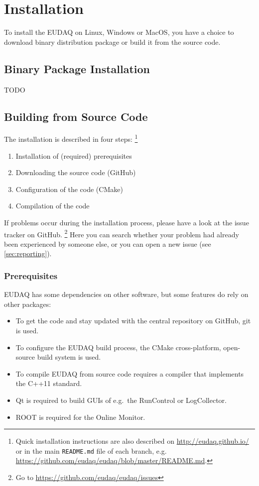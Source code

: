 \section{Installation}
To install the EUDAQ on Linux, Windows or MacOS, you have a choice to download binary distribution package or build it from the source code.

\subsection{Binary Package Installation}
TODO


\subsection{Building from Source Code}

The installation is described in four steps:%
\footnote{Quick installation instructions are also described on \url{http://eudaq.github.io/} or in the main \texttt{README.md} file of each branch, e.g. \url{https://github.com/eudaq/eudaq/blob/master/README.md}.}
\begin{enumerate}
\item Installation of (required) prerequisites
\item Downloading the source code (GitHub)
\item Configuration of the code (CMake)
\item Compilation of the code
\end{enumerate}

If problems occur during the installation process, please have a look at the issue tracker on GitHub.%
\footnote{Go to \url{https://github.com/eudaq/eudaq/issues}} 
Here you can search whether your problem had already been experienced by someone else, or you can open a new issue (see \autoref{sec:reporting}).

\subsubsection{Prerequisites}

EUDAQ has some dependencies on other software, but some features do rely on other packages:
\begin{itemize}
\item To get the code and stay updated with the central repository on GitHub, git is used.
\item To configure the EUDAQ build process, the CMake cross-platform, open-source build system is used.
\item To compile EUDAQ from source code requires a compiler that implements the C++11 standard.
\item Qt is required to build GUIs of e.g.\ the RunControl or LogCollector. 
\item ROOT is required for the Online Monitor.
\end{itemize}

